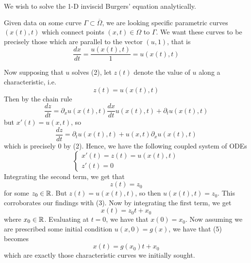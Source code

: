\documentclass{myproject}
\begin{document}
We wish to solve the 1-D inviscid Burgers' equation analytically.

Given data on some curve $ \Gamma \subset \overline{\Omega} $, we are looking specific parametric curves $ (x(t), t) $ which connect points $(x, t) \in \Omega$ to $ \Gamma $. We want these curves to be precisely those which are parallel to the vector $(u, 1)$, that is
\[
    \frac{dx}{dt} = \frac{u(x(t), t)}{1} = u(x(t), t)
\]

Now supposing that $u$ solves (2), let $z(t)$ denote the value of $u$ along a characteristic, i.e. 
\[
    z(t) = u(x(t), t)
\]
Then by the chain rule
\[
    \frac{dz}{dt} = \partial_x u(x(t), t) \frac{dx}{dt}u(x(t), t) + \partial_t u(x(t), t)
\]
but $ x'(t) = u(x,t) $, so
\[
    \frac{dz}{dt} = \partial_t u(x(t), t) + u(x,t)\partial_x u(x(t), t)
\]
which is precisely 0 by (2). Hence, we have the following coupled system of ODEs
\begin{equation}
    \begin{cases}
        x'(t) = z(t) = u(x(t), t) \\
        z'(t) = 0
    \end{cases}
\end{equation}
Integrating the second term, we get that
\[
    z(t) = z_0
\]
for some $ z_0 \in \operatorname{\mathbb{R}} $. But $z(t) = u(x(t), t)$, so then $u(x(t), t) = z_0$. This corroborates our findings with (3). Now by integrating the first term, we get
\begin{equation}
    x(t) = z_0t + x_0
\end{equation}
where $ x_0 \in \operatorname{\mathbb{R}} $. Evaluating at $t=0$, we have that $x(0) = x_0$. Now assuming we are prescribed some initial condition $u(x,0) = g(x)$, we have that (5) becomes
\begin{equation}
    x(t) = g(x_0)t + x_0
\end{equation}
which are exactly those characteristic curves we initially sought.

\nocite{choksi2022}
\nocite{iserles2009}
\nocite{leveque1992}
\nocite{leveque2002}
\printbibliography
\end{document}
